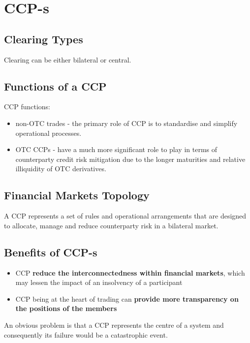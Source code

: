 \chapter{CCP-s}

\section{Clearing Types}
Clearing can be either bilateral or central.

\section{Functions of a CCP}
CCP functions:
\begin{itemize}
	\item non-OTC trades - the primary role of CCP is to standardise and simplify operational processes.
	\item OTC CCPs - have a much more significant role to play in terms of counterparty credit risk mitigation due to the longer maturities and relative illiquidity of OTC derivatives. 
\end{itemize}

\section{Financial Markets Topology}
A CCP represents a set of rules and operational arrangements that are designed to allocate, manage and reduce counterparty risk in a bilateral market.

\section{Benefits of CCP-s}
\begin{itemize}
	\item CCP \textbf{\color{blue}reduce the interconnectedness within financial markets}, which may lessen the impact of an insolvency of a participant
	\item CCP being at the heart of trading can \textbf{\color{blue}provide more transparency on the positions of the members}
\end{itemize}
An obvious problem is that a CCP represents the centre of a system and consequently its failure would be a catastrophic event.

